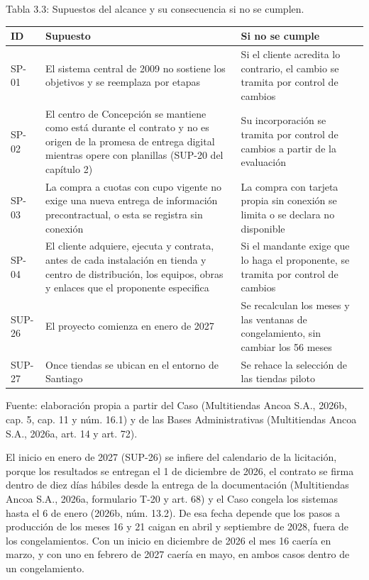 \documentclass[11pt]{article}
\begin{document}
Tabla 3.3: Supuestos del alcance y su consecuencia si no se cumplen.

\begin{longtable}[]{@{}
  >{\raggedright\arraybackslash}p{}
  >{\raggedright\arraybackslash}p{}
  >{\raggedright\arraybackslash}p{}@{}}
\toprule\noalign{}
ID & Supuesto & Si no se cumple \\
\midrule\noalign{}
\endhead
\bottomrule\noalign{}
\endlastfoot
SP-01 & El sistema central de 2009 no sostiene los objetivos y se reemplaza por etapas & Si el cliente acredita lo contrario, el cambio se tramita por control de cambios \\
SP-02 & El centro de Concepción se mantiene como está durante el contrato y no es origen de la promesa de entrega digital mientras opere con planillas (SUP-20 del capítulo 2) & Su incorporación se tramita por control de cambios a partir de la evaluación \\
SP-03 & La compra a cuotas con cupo vigente no exige una nueva entrega de información precontractual, o esta se registra sin conexión & La compra con tarjeta propia sin conexión se limita o se declara no disponible \\
SP-04 & El cliente adquiere, ejecuta y contrata, antes de cada instalación en tienda y centro de distribución, los equipos, obras y enlaces que el proponente especifica & Si el mandante exige que lo haga el proponente, se tramita por control de cambios \\
SUP-26 & El proyecto comienza en enero de 2027 & Se recalculan los meses y las ventanas de congelamiento, sin cambiar los 56 meses \\
SUP-27 & Once tiendas se ubican en el entorno de Santiago & Se rehace la selección de las tiendas piloto \\
\end{longtable}

Fuente: elaboración propia a partir del Caso (Multitiendas Ancoa S.A., 2026b, cap. 5, cap. 11 y núm. 16.1) y de las Bases Administrativas (Multitiendas Ancoa S.A., 2026a, art. 14 y art. 72).

El inicio en enero de 2027 (SUP-26) se infiere del calendario de la licitación, porque los resultados se entregan el 1 de diciembre de 2026, el contrato se firma dentro de diez días hábiles desde la entrega de la documentación (Multitiendas Ancoa S.A., 2026a, formulario T-20 y art. 68) y el Caso congela los sistemas hasta el 6 de enero (2026b, núm. 13.2). De esa fecha depende que los pasos a producción de los meses 16 y 21 caigan en abril y septiembre de 2028, fuera de los congelamientos. Con un inicio en diciembre de 2026 el mes 16 caería en marzo, y con uno en febrero de 2027 caería en mayo, en ambos casos dentro de un congelamiento.
\end{document}
